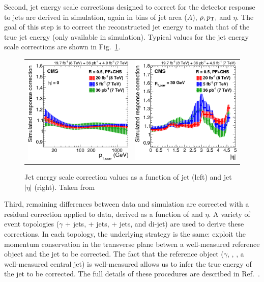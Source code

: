 Second, jet energy scale corrections designed to correct for the detector response to jets are derived in simulation, again in bins of jet area ($A$), $\rho, p_{\mathrm{T}},$ and $\eta$.
The goal of this step is to correct the reconstructed jet energy to match that of the true jet energy (only available in simulation).
Typical values for the jet energy scale corrections are shown in Fig.~\ref{fig:evt_jet_jec_corrections}. 
\begin{figure} [h!]
    \centering
    \begin{tabular}{c c}
        \includegraphics[width=0.48\linewidth]{figures/event_reconstruction_and_selection/jetmet8Tev_Figure_014-a.png} &
        \includegraphics[width=0.48\linewidth]{figures/event_reconstruction_and_selection/jetmet8Tev_Figure_014-b.png}
    \end{tabular}
    \caption{Jet energy scale correction values as a function of jet \pT (left) and jet $|\eta|$ (right). Taken from~\cite{Khachatryan_2017_jets}}
    \label{fig:evt_jet_jec_corrections}
\end{figure}

Third, remaining differences between data and simulation are corrected with a residual correction applied to data, derived as a function of \pT and $\eta$.
A variety of event topologies ($\gamma$ + jets, \Zee + jets, \Zuu + jets, and di-jet) are used to derive these corrections.
In each topology, the underlying strategy is the same: exploit the momentum conservation in the transverse plane betwen a well-measured reference object and the jet to be corrected.
The fact that the reference object ($\gamma$, \Zee, \Zuu, a well-measured central jet) is well-measured allows us to infer the true energy of the jet to be corrected.
The full details of these procedures are described in Ref.~\cite{Khachatryan_2017_jets}.

